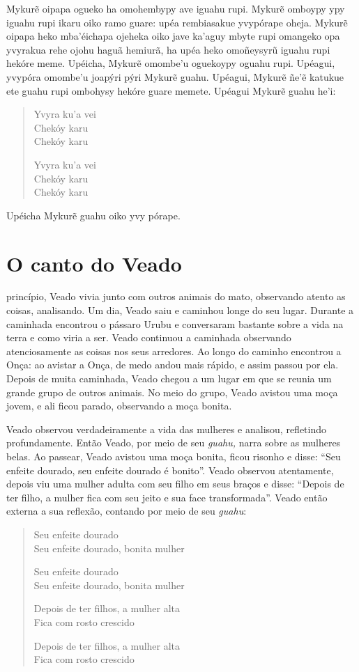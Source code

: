 Mykurẽ oipapa ogueko ha omohembypy ave iguahu rupi. Mykurẽ omboypy ypy
iguahu rupi ikaru oiko ramo guare: upéa rembiasakue yvypórape oheja.
Mykurẽ oipapa heko mba'éichapa ojeheka oiko jave ka'aguy mbyte rupi
omangeko opa yvyrakua rehe ojohu haguã hemiurã, ha upéa heko omoñeysyrũ
iguahu rupi hekóre meme. Upéicha, Mykurẽ omombe'u oguekoypy oguahu rupi.
Upéagui, yvypóra omombe'u joapýri pýri Mykurẽ guahu. Upéagui, Mykurẽ
ñe'ẽ katukue ete guahu rupi ombohysy hekóre guare memete. Upéagui Mykurẽ
guahu he'i:

\begin{verse}
Yvyra ku'a vei\\
Chekóy karu\\
Chekóy karu

Yvyra ku'a vei\\
Chekóy karu\\
Chekóy karu
\end{verse}
Upéicha Mykurẽ guahu oiko yvy pórape.


\chapter{O canto do Veado}

 princípio, Veado vivia junto com outros animais do mato, observando
atento as coisas, analisando. Um dia, Veado saiu e caminhou longe do seu
lugar. Durante a caminhada encontrou o pássaro Urubu e conversaram
bastante sobre a vida na terra e como viria a ser. Veado continuou a
caminhada observando atenciosamente as coisas nos seus arredores. Ao
longo do caminho encontrou a Onça: ao avistar a Onça, de medo andou mais
rápido, e assim passou por ela. Depois de muita caminhada, Veado chegou
a um lugar em que se reunia um grande grupo de outros animais. No meio
do grupo, Veado avistou uma moça jovem, e ali ficou parado, observando a
moça bonita.

Veado observou verdadeiramente a vida das mulheres e analisou,
refletindo profundamente. Então Veado, por meio de seu \emph{guahu,}
narra sobre as mulheres belas. Ao passear, Veado avistou uma moça
bonita, ficou risonho e disse: ``Seu enfeite dourado, seu enfeite
dourado é bonito''. Veado observou atentamente, depois viu uma mulher
adulta com seu filho em seus braços e disse: ``Depois de ter filho, a
mulher fica com seu jeito e sua face transformada''. Veado então externa
a sua reflexão, contando por meio de seu \emph{guahu}:

\begin{verse}
Seu enfeite dourado\\
Seu enfeite dourado, bonita mulher

Seu enfeite dourado\\
Seu enfeite dourado, bonita mulher

Depois de ter filhos, a mulher alta\\
Fica com rosto crescido

Depois de ter filhos, a mulher alta\\
Fica com rosto crescido
\end{verse}


